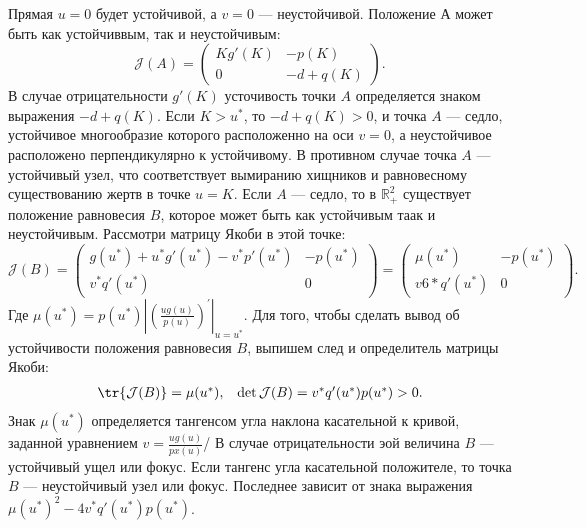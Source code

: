 Прямая $u = 0$ будет устойчивой, а  $v = 0$ --- неустойчивой.
Положение $А$ может быть как устойчиввым, так и неустойчивым: 
\begin{equation*}
\mathcal{J}(A) = 
\left(
\begin{array}{cc}
Kg'(K) & -p(K)\\
0 & -d + q(K)
\end{array}
\right).
\end{equation*}
В случае отрицательности $g'(K)$ усточивость точки $A$ определяется знаком выражения $-d + q(K)$. Если $K > u^*$, то $-d + q(K) > 0$, и точка $A$ --- седло, устойчивое многообразие которого расположенно на оси $v = 0$, а неустойчивое расположено перпендикулярно к устойчивому. В противном случае точка $A$ --- устойчивый узел, что соответствует вымиранию хищников и равновесному существованию жертв в точке $u=K$. 
Если $A$ --- седло, то в $\mathbb{R}_+^2$ существует положение равновесия $B$, которое может быть как устойчивым таак и неустойчивым. Рассмотри матрицу Якоби в этой точке:
\begin{equation*}
\mathcal{J}(B) = 
\left(
\begin{array}{cc}
g(u^*) + u^* g'(u^*) - v^* p'(u^*)& -p(u^*)\\
v^* q'(u^*) & 0
\end{array}
\right) = 
\left(
\begin{array}{cc}
	\mu(u^*) & -p(u^*)\\
	v6* q'(u^*) & 0
\end{array}
\right).
\end{equation*}
Где $\mu(u^*) = p(u^*)\left| \left(\frac{ug(u)}{p(u)} \right)^{'} \right|_{u=u^*}$. Для того, чтобы сделать вывод об устойчивости положения равновесия $B$, выпишем след и определитель матрицы Якоби:
\begin{equation*}
\begin{array}{lr}
\tr{\mathcal{J}(B)} = \mu(u^*), &  \det{\mathcal{J}(B)} = v^* q'(u^*)p(u^*) > 0.
\end{array}
\end{equation*} 
Знак $\mu(u^*)$ определяется тангенсом угла наклона касательной к кривой, заданной уравнением $v = \frac{ug(u)}{px(u)}$/ В случае отрицательности эой величина $B$ --- устойчивый ущел или фокус. Если тангенс угла касательной положителе, то точка $B$ --- неустойчивый узел или фокус. Последнее зависит от знака выражения $\mu(u^*)^2 - 4v^* q'(u^*)p(u^*)$.


